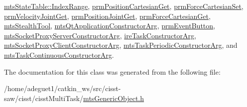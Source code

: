 \hyperlink{classmts_state_table_1_1_index_range_aee1ef0cd5b41b955416cce4212dd398d}{mts\-State\-Table\-::\-Index\-Range}, \hyperlink{classprm_position_cartesian_get_a8ba57f6879b5d0ccde3e5d75f49a14d9}{prm\-Position\-Cartesian\-Get}, \hyperlink{classprm_force_cartesian_set_a5cddf5bcd6c9663b7e435c4b9bddf1af}{prm\-Force\-Cartesian\-Set}, \hyperlink{classprm_velocity_joint_get_aa30c7cd787323214de8f7b1775af95d8}{prm\-Velocity\-Joint\-Get}, \hyperlink{classprm_position_joint_get_af86770522846be112b6472118d73865b}{prm\-Position\-Joint\-Get}, \hyperlink{classprm_force_cartesian_get_ab632a651988b5cdb45b04e386ca29f45}{prm\-Force\-Cartesian\-Get}, \hyperlink{classmts_stealth_tool_a6bfabcb3bee465c02dc9c42578dfd220}{mts\-Stealth\-Tool}, \hyperlink{classmts_qt_application_constructor_arg_adab540a9de65d898b488a3628bf46bf3}{mts\-Qt\-Application\-Constructor\-Arg}, \hyperlink{classprm_event_button_a2811ddd9856b125f561d9e71dae541b0}{prm\-Event\-Button}, \hyperlink{classmts_socket_proxy_server_constructor_arg_a3555d9c68b3ce38590adc22c3e0d2755}{mts\-Socket\-Proxy\-Server\-Constructor\-Arg}, \hyperlink{classire_task_constructor_arg_a5418e8c1dfd71d99f789b615c9eed5d6}{ire\-Task\-Constructor\-Arg}, \hyperlink{classmts_socket_proxy_client_constructor_arg_a3b8e88637fd8afe325d30bf365e1e612}{mts\-Socket\-Proxy\-Client\-Constructor\-Arg}, \hyperlink{classmts_task_periodic_constructor_arg_a4820a784c730fdb160090b77675485e8}{mts\-Task\-Periodic\-Constructor\-Arg}, and \hyperlink{classmts_task_continuous_constructor_arg_a2cdec03572448b0e6783ca3c07bf3b93}{mts\-Task\-Continuous\-Constructor\-Arg}.



The documentation for this class was generated from the following file\-:\begin{DoxyCompactItemize}
\item 
/home/adeguet1/catkin\-\_\-ws/src/cisst-\/saw/cisst/cisst\-Multi\-Task/\hyperlink{mts_generic_object_8h}{mts\-Generic\-Object.\-h}\end{DoxyCompactItemize}
